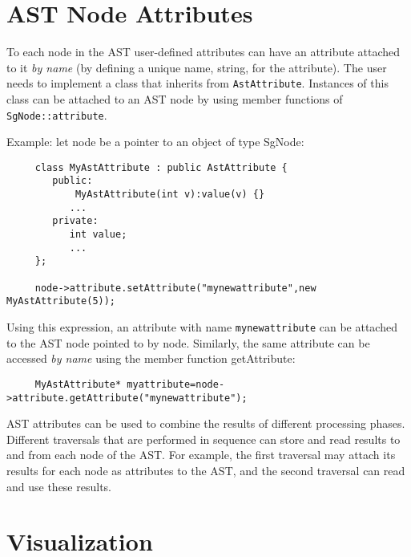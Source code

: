 
\section{AST Node Attributes}

To each node in the AST user-defined attributes can have an attribute attached to 
it {\em by name} (by defining a unique name, string, for the attribute). The
user needs to implement a class that inherits from {\tt AstAttribute}. Instances of this
class can be attached to an AST node by using member functions of {\tt SgNode::attribute}.

Example: let node be a pointer to an object of type SgNode:
{\indent
{\mySmallFontSize
\begin{verbatim}
     class MyAstAttribute : public AstAttribute {
        public:
	        MyAstAttribute(int v):value(v) {}
           ...
        private:
           int value;
           ...
     };

     node->attribute.setAttribute("mynewattribute",new MyAstAttribute(5));
\end{verbatim}
}}
Using this expression, an attribute with name {\tt mynewattribute} can
be attached to the AST node pointed to by node. Similarly, the same attribute can be
accessed {\em by name} using the member function getAttribute:

{\indent
{\mySmallFontSize
\begin{verbatim}
     MyAstAttribute* myattribute=node->attribute.getAttribute("mynewattribute");
\end{verbatim}
}}
AST attributes can be used to combine the results of different
processing phases. Different traversals that are performed in
sequence can store and read results to and from each node of the
AST. For example, the first traversal may attach its results for each node as
attributes to the AST, and the second traversal can read and use these results.


\section{Visualization}

